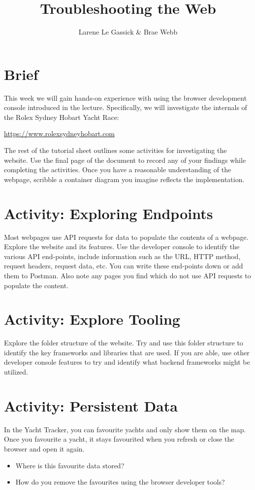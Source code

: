 \documentclass{csse4400}
\title{Troubleshooting the Web}
\author{Larene Le Gassick \& Brae Webb}
\date{\week{5}}
\begin{document}
\maketitle

\section{Brief}

This week we will gain hands-on experience with using the browser development console introduced in the lecture.
Specifically, we will investigate the internals of the Rolex Sydney Hobart Yacht Race:

\noindent\url{https://www.rolexsydneyhobart.com}

The rest of the tutorial sheet outlines some activities for investigating the website.
Use the final page of the document to record any of your findings while completing the activities.
Once you have a reasonable understanding of the webpage,
scribble a container diagram you imagine reflects the implementation.

\section{Activity: Exploring Endpoints}
Most webpages use API requests for data to populate the contents of a webpage.
Explore the website and its features.
Use the developer console to identify the various API end-points,
include information such as the URL, HTTP method, request headers, request data, etc.
You can write these end-points down or add them to Postman.
Also note any pages you find which do not use API requests to populate the content.

\section{Activity: Explore Tooling}
Explore the folder structure of the website.
Try and use this folder structure to identify the key frameworks and libraries that are used.
If you are able,
use other developer console features to try and identify what backend frameworks might be utilized.

\section{Activity: Persistent Data}
In the Yacht Tracker,
you can favourite yachts and only show them on the map.
Once you favourite a yacht,
it stays favourited when you refresh or close the browser and open it again.\vspace{-0.6em}
\begin{itemize}
    \setlength\itemsep{-0.5em}
    \item Where is this favourite data stored?
    \item How do you remove the favourites using the browser developer tools?
\end{itemize}
\end{document}
